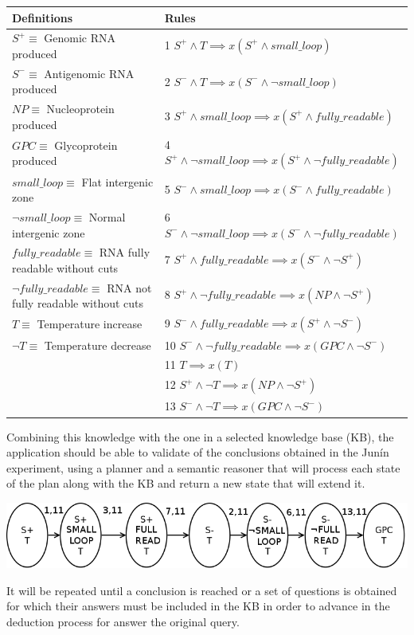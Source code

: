 \documentclass[portrait,final,a0paper,fontscale=0.277]{baposter}
\begin{document}
\begin{poster}
{	\resizebox{\linewidth}{!} {
  	\begin{tabular}{l l}
	Definitions								& Rules\\
	\hline
	$S^{+}\equiv$ Genomic RNA produced 
	& 1  $S^{+}\wedge T\implies x(S^{+}\wedge small\_loop)$ \\
	$S^{-}\equiv$ Antigenomic RNA produced 	
	& 2  $S^{-}\wedge T\implies x(S^{-}\wedge\neg small\_loop)$\\
	$NP\equiv$ Nucleoprotein produced 		
	& 3  $S^{+}\wedge small\_loop\implies x(S^{+}\wedge fully\_readable)$\\
	$GPC\equiv$ Glycoprotein produced 		
	& 4  $S^{+}\wedge\neg small\_loop\implies x(S^{+}\wedge\neg fully\_readable)$\\
	$small\_loop\equiv$ Flat intergenic zone 
	& 5  $S^{-}\wedge small\_loop\implies x(S^{-}\wedge fully\_readable)$\\
	$\neg small\_loop\equiv$ Normal intergenic zone 
	& 6  $S^{-}\wedge\neg small\_loop\implies x(S^{-}\wedge\neg fully\_readable)$\\
	$fully\_readable\equiv$ RNA fully readable without cuts 
	& 7  $S^{+}\wedge fully\_readable\implies x(S^{-}\wedge\neg S^{+})$\\
	$\neg fully\_readable\equiv$ RNA not fully readable without cuts 
	& 8  $S^{+}\wedge\neg fully\_readable\implies x(NP\wedge\neg S^{+})$\\
	$T\equiv$ Temperature increase
	& 9  $S^{-}\wedge fully\_readable\implies x(S^{+}\wedge\neg S^{-})$ \\
	$\neg T\equiv$ Temperature decrease 
	& 10 $S^{-}\wedge\neg fully\_readable\implies x(GPC\wedge\neg S^{-})$\\
	& 11 $T\implies x(T)$\\
	& 12 $S^{+}\wedge\neg T\implies x(NP\wedge\neg S^{+})$\\
	& 13 $S^{-}\wedge\neg T\implies x(GPC\wedge\neg S^{-})$\\
	\end{tabular}
    }
    \begin{flushleft}
	Combining this knowledge with the one in a selected knowledge base (KB), 
	the application should be able to validate of the conclusions obtained 
	in the Junín experiment\cite{Junin}, using a planner and a semantic 
	reasoner that will process each state of the plan along with the KB and 
	return a new state that will extend it.
	\end{flushleft}
    \includegraphics[width=\linewidth]{1st_approach_1}
	\begin{flushleft}
	It will be repeated until a conclusion is reached or a set of questions 
	is obtained for which their answers must be included in the KB in order 
	to advance in the deduction process for answer the original query.
	\end{flushleft}
   }
   

\end{poster}
\end{document}
